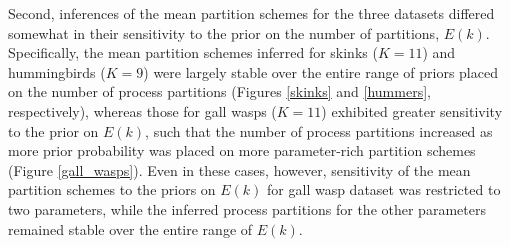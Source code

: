 \documentclass[11pt]{article}
\begin{document}
Second, inferences of the mean partition schemes for the three datasets differed somewhat in their sensitivity to the prior on the number of partitions, $E(k)$.  
Specifically, the mean partition schemes inferred for skinks ($K = 11$) and hummingbirds ($K = 9$) were largely stable over the entire range of priors 
placed on the number of process partitions (Figures \ref{skinks} and \ref{hummers}, respectively), whereas those for gall wasps ($K = 11$) exhibited greater sensitivity to the prior on $E(k)$, such that the number of process partitions increased as more prior probability was placed on more parameter-rich partition schemes (Figure \ref{gall_wasps}).  
Even in these cases, however, sensitivity of the mean partition schemes to the priors on $E(k)$ for gall wasp dataset was restricted to two parameters, while the inferred process partitions for the other parameters remained stable over the entire range of $E(k)$.
\end{document}
